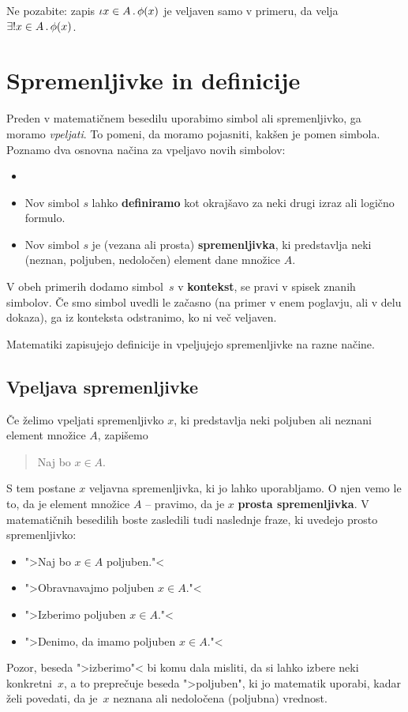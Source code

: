 \begin{opomba}
  Ne pozabite: zapis $\iota x \in A \,.\, \phi(x)$ je veljaven samo v primeru, da velja
  $\exists! x \in A \,.\, \phi(x)$.
\end{opomba}


\section{Spremenljivke in definicije}

Preden v matematičnem besedilu uporabimo simbol ali spremenljivko, ga moramo \emph{vpeljati}. To pomeni, da moramo pojasniti, kakšen je pomen simbola. Poznamo dva osnovna načina za vpeljavo novih simbolov:
%
\begin{itemize}
\item \item Nov simbol $s$ lahko \textbf{definiramo} kot okrajšavo za neki drugi izraz ali logično formulo.
\item Nov simbol $s$ je (vezana ali prosta) \textbf{spremenljivka}, ki predstavlja neki (neznan, poljuben, nedoločen) element dane množice $A$.
\end{itemize}
%
V obeh primerih dodamo simbol~$s$ v \textbf{kontekst}, se pravi v spisek znanih simbolov. Če smo simbol uvedli le začasno (na primer v enem poglavju, ali v delu dokaza), ga iz konteksta odstranimo, ko ni več veljaven.

Matematiki zapisujejo definicije in vpeljujejo spremenljivke na razne načine.

\subsection{Vpeljava spremenljivke}

Če želimo vpeljati spremenljivko $x$, ki predstavlja neki poljuben ali neznani element množice $A$, zapišemo
%
\begin{quote}
  Naj bo $x \in A$.
\end{quote}
%
S tem postane $x$ veljavna spremenljivka, ki jo lahko uporabljamo. O njen vemo le to, da je element množice $A$ -- pravimo, da je $x$ \textbf{prosta spremenljivka}. V matematičnih besedilih boste zasledili tudi naslednje fraze, ki uvedejo prosto spremenljivko:
%
\begin{itemize}
\item ">Naj bo $x \in A$ poljuben."<
\item ">Obravnavajmo poljuben $x \in A$."<
\item ">Izberimo poljuben $x \in A$."<
\item ">Denimo, da imamo poljuben $x \in A$."<
\end{itemize}
%
Pozor, beseda ">izberimo"< bi komu dala misliti, da si lahko izbere neki konkretni~$x$, a to preprečuje beseda ">poljuben", ki jo matematik uporabi, kadar želi povedati, da je~$x$ neznana ali nedoločena (poljubna) vrednost.

